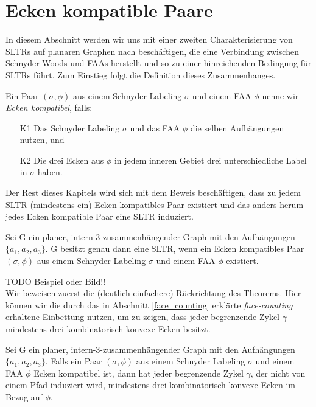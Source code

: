 \section{Ecken kompatible Paare}

In diesem Abschnitt werden wir uns mit einer zweiten Charakterisierung von SLTRs auf planaren Graphen nach \cite{af15} beschäftigen, die eine Verbindung zwischen Schnyder Woods und FAAs herstellt und so zu einer hinreichenden Bedingung für SLTRs führt. Zum Einstieg folgt die Definition dieses Zusammenhanges.

\begin{definition}\label{def_ccc}
Ein Paar $(\sigma,\phi)$ aus einem Schnyder Labeling $\sigma$ und einem FAA $\phi$ nenne wir \textit{Ecken kompatibel}, falls:
\begin{itemize}
\item [K1] Das Schnyder Labeling $\sigma$ und das FAA $\phi$ die selben Aufhängungen nutzen, und
\item [K2] Die drei Ecken aus $\phi$ in jedem inneren Gebiet drei unterschiedliche Label in $\sigma$ haben.
\end{itemize}
\end{definition}

Der Rest dieses Kapitels wird sich mit dem Beweis beschäftigen, dass zu jedem SLTR (mindestens ein) Ecken kompatibles Paar existiert und das anders herum jedes Ecken kompatible Paar eine SLTR induziert.

\begin{theorem}\label{theo_ccc}
Sei G ein planer, intern-3-zusammenhängender Graph mit den Aufhängungen $\{a_1,a_2,a_3\}$. G besitzt genau dann eine SLTR, wenn ein Ecken kompatibles Paar $(\sigma,\phi)$ aus einem Schnyder Labeling $\sigma$ und einem FAA $\phi$ existiert.
\end{theorem}

TODO Beispiel oder Bild!! \\

Wir beweisen zuerst die (deutlich einfachere) Rückrichtung des Theorems. Hier können wir die durch das in Abschnitt \ref{face_counting} erklärte \textit{face-counting} erhaltene Einbettung nutzen, um zu zeigen, dass jeder begrenzende Zykel $\gamma$ mindestens drei kombinatorisch konvexe Ecken besitzt. 

\begin{lemma}\label{lem1}
Sei G ein planer, intern-3-zusammenhängender Graph mit den Aufhängungen $\{a_1,a_2,a_3\}$. Falls ein Paar $(\sigma,\phi)$ aus einem Schnyder Labeling $\sigma$ und einem FAA $\phi$ Ecken kompatibel ist, dann hat jeder begrenzende Zykel $\gamma$, der nicht von einem Pfad induziert wird, mindestens drei kombinatorisch konvexe Ecken im Bezug auf $\phi$.
\end{lemma}

